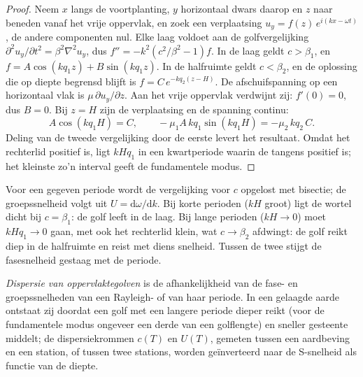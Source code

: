 \begin{proof}
Neem $x$ langs de voortplanting, $y$ horizontaal dwars daarop en $z$ naar beneden vanaf
het vrije oppervlak, en zoek een verplaatsing
$u_y = f(z)\,e^{i(kx - \omega t)}$, de andere componenten nul. Elke laag
voldoet aan de golfvergelijking $\partial^2 u_y/\partial t^2 = \beta^2\nabla^2 u_y$, dus
$f'' = -k^2\left(c^2/\beta^2 - 1\right) f$. In de laag geldt $c > \beta_1$, en
$f = A\cos(kq_1z) + B\sin(kq_1z)$. In de halfruimte geldt $c < \beta_2$, en de
oplossing die op diepte begrensd blijft is $f = C\,e^{-kq_2(z - H)}$.
De afschuifspanning op een horizontaal vlak is $\mu\,\partial u_y/\partial z$.
Aan het vrije oppervlak verdwijnt zij: $f'(0) = 0$, dus $B = 0$. Bij $z = H$ zijn de
verplaatsing en de spanning continu:
\[
  A\cos(kq_1H) = C, \qquad -\mu_1 A\,kq_1\sin(kq_1H) = -\mu_2\,kq_2\,C .
\]
Deling van de tweede vergelijking door de eerste levert het resultaat. Omdat het
rechterlid positief is, ligt $kHq_1$ in een kwartperiode waarin de
tangens positief is; het kleinste zo'n interval geeft de fundamentele modus.
\end{proof}

Voor een gegeven periode wordt de vergelijking voor $c$ opgelost met bisectie; de
groepssnelheid volgt uit $U = \mathrm d\omega/\mathrm dk$. Bij korte perioden
($kH$ groot) ligt de wortel dicht bij $c = \beta_1$: de golf leeft in de laag. Bij
lange perioden ($kH \to 0$) moet $kHq_1 \to 0$ gaan, met ook het rechterlid
klein, wat $c \to \beta_2$ afdwingt: de golf reikt diep in de
halfruimte en reist met diens snelheid. Tussen de twee stijgt de fasesnelheid
gestaag met de periode.

\begin{definition}\label{def:b3:seismology-imaging:dispersion}
\emph{Dispersie van oppervlaktegolven} is de afhankelijkheid
van de fase- en groepssnelheden van een Rayleigh- of  van haar periode. In
een gelaagde aarde ontstaat zij doordat een golf met een langere periode dieper reikt
(voor de fundamentele modus ongeveer een derde van een golflengte) en sneller
gesteente middelt; de dispersiekrommen $c(T)$ en $U(T)$, gemeten tussen een aardbeving
en een station, of tussen twee stations, worden geïnverteerd naar de S-snelheid als
functie van de diepte.
\end{definition}

